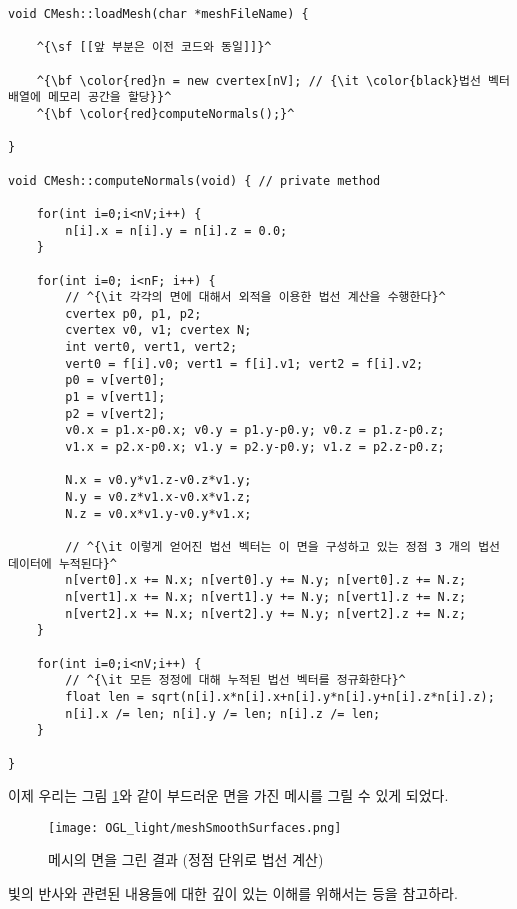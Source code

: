 \begin{algorithmbis}\label{code:OGL_light:meshClassImplementation}
\lstset{language=C++, escapechar=^} 
\begin{lstlisting}
void CMesh::loadMesh(char *meshFileName) {

    ^{\sf [[앞 부분은 이전 코드와 동일]]}^
    
    ^{\bf \color{red}n = new cvertex[nV]; // {\it \color{black}법선 벡터 배열에 메모리 공간을 할당}}^
    ^{\bf \color{red}computeNormals();}^
    
}

void CMesh::computeNormals(void) { // private method
    
    for(int i=0;i<nV;i++) {
        n[i].x = n[i].y = n[i].z = 0.0;
    }
    
    for(int i=0; i<nF; i++) {
        // ^{\it 각각의 면에 대해서 외적을 이용한 법선 계산을 수행한다}^
        cvertex p0, p1, p2;
        cvertex v0, v1; cvertex N;
        int vert0, vert1, vert2;
        vert0 = f[i].v0; vert1 = f[i].v1; vert2 = f[i].v2;
        p0 = v[vert0];
        p1 = v[vert1];
        p2 = v[vert2];
        v0.x = p1.x-p0.x; v0.y = p1.y-p0.y; v0.z = p1.z-p0.z;
        v1.x = p2.x-p0.x; v1.y = p2.y-p0.y; v1.z = p2.z-p0.z;
        
        N.x = v0.y*v1.z-v0.z*v1.y;
        N.y = v0.z*v1.x-v0.x*v1.z;
        N.z = v0.x*v1.y-v0.y*v1.x;

        // ^{\it 이렇게 얻어진 법선 벡터는 이 면을 구성하고 있는 정점 3 개의 법선 데이터에 누적된다}^
        n[vert0].x += N.x; n[vert0].y += N.y; n[vert0].z += N.z;
        n[vert1].x += N.x; n[vert1].y += N.y; n[vert1].z += N.z;
        n[vert2].x += N.x; n[vert2].y += N.y; n[vert2].z += N.z;
    }
    
    for(int i=0;i<nV;i++) {
        // ^{\it 모든 정정에 대해 누적된 법선 벡터를 정규화한다}^
        float len = sqrt(n[i].x*n[i].x+n[i].y*n[i].y+n[i].z*n[i].z);
        n[i].x /= len; n[i].y /= len; n[i].z /= len;
    }
    
}
\end{lstlisting}
\end{algorithmbis}

이제 우리는 그림 \ref{fig:OGL_light:meshSmoothSurfaces}와 같이 부드러운 면을 가진 메시를 그릴 수 있게 되었다.

\begin{figure}[h!]
  \centering
    \texttt{[image: OGL\_light/meshSmoothSurfaces.png]}
    \caption{메시의 면을 그린 결과 (정점 단위로 법선 계산)}
    \label{fig:OGL_light:meshSmoothSurfaces}
\end{figure}

빛의 반사와 관련된 내용들에 대한 깊이 있는 이해를 위해서는 \cite{akenine2011real,pharr2004physically} 등을 참고하라.